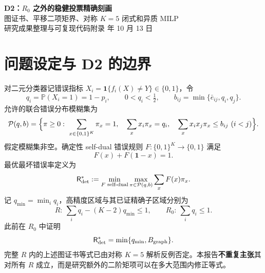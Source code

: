 \documentclass[11pt,a4paper]{ctexart}
\theoremstyle{definition}
\newcommand{\Pset}{\mathcal P}
\newcommand{\Risk}{\mathsf R}
\newcommand{\I}{\mathbf 1}
\newcommand{\bbone}{\mathbf 1}
\newcommand{\Prb}{\mathbb P}
\begin{document}
\begin{center}
{\LARGE\bfseries D2：$R_0$ 之外的稳健投票精确刻画}\\[7pt]
{\large 图证书、平移二项矩界、对称 $K=5$ 闭式和异质 MILP}\\[8pt]
{\normalsize 研究成果整理与可复现代码附录  年 10 月 13 日}
\end{center}

\begin{abstract}
\sloppy
研究 $K$ 个二元分类器的确定性 self-dual minimax 集成投票：已知单个模型错误概率 $q_i$，并仅掌握成对共同出错概率的上界 $b_{ij}$。前期已证明图证书在 $R_0=\{\sum_iq_i\le1\}$ 中精确，但 $R_0$ 以外无法丢掉二次对偶中的常数项与负一阶系数。本 D2 阶段得到：\textbf{（1）} 完全对称的 $K=5$ 模型具有闭式
\[
\Risk_{\rm det}^*(q,b)=\min\{q,3b,1-5q+10b\},
\]
以关键顶点上覆盖全部 65,536 个 self-dual 布尔规则的精确有理数证书构成\textbf{计算机辅助证明}；\textbf{（2）} 为异质 $K=5$ 给出使用 16 个二元变量与 16 个连续变量、无 big-$M$ 的精确 MILP 数学表述；\textbf{（3）} 给出适用于奇数子集的平移二阶矩上界、图证书的统一候选族及其严谨的适用边界。异质 $K=5$ 的简单闭式仍是猜想，不能把 MILP 的浮点吻合写成证明。
\end{abstract}

\tableofcontents
\newpage

\section{问题设定与 D2 的边界}
对二元分类器记错误指标 $X_i=\I\{f_i(X)\neq Y\}\in\{0,1\}$，令
\[
q_i=\Prb(X_i=1)=1-p_i,\qquad 0<q_i<\tfrac12,
\qquad b_{ij}=\min\{\bar e_{ij},q_i,q_j\}.
\]
允许的联合错误分布模糊集为
\begin{equation}\label{eq:P}
\Pset(q,b)=\Bigl\{\pi\ge0:\ \sum_{x\in\{0,1\}^K}\pi_x=1,\quad
\sum_x x_i\pi_x=q_i,\quad
\sum_xx_ix_j\pi_x\le b_{ij}\ (i<j)\Bigr\}.
\end{equation}
假定模糊集非空。确定性 self-dual 错误规则 $F:\{0,1\}^K\to\{0,1\}$ 满足
\[
F(x)+F(\bbone-x)=1.
\]
最优最坏错误率定义为
\begin{equation}\label{eq:minimax}
\Risk_{\rm det}^*:=\min_{F\text{ self-dual}}\max_{\pi\in\Pset(q,b)}\sum_xF(x)\pi_x.
\end{equation}
记 $q_{\min}=\min_iq_i$，高精度区域与其已证精确子区域分别为
\[
R:\ \sum_iq_i-(K-2)q_{\min}\le1,
\qquad
R_0:\ \sum_iq_i\le1.
\]
此前在 $R_0$ 中证明
\begin{equation}\label{eq:R0}
\Risk_{\rm det}^*=\min\{q_{\min},B_{\rm graph}\}.
\end{equation}
完整 $R$ 内的上述图证书等式已由对称 $K=5$ 解析反例否定。本报告\textbf{不重复主张}其对所有 $R$ 成立，而是研究额外的二阶矩项可以在多大范围内修正等式。
\end{document}
